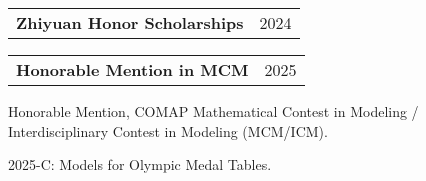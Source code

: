 \documentclass[letterpaper,11pt]{article}
\makeatletter
\newcommand{\cvitem}[1]{
  \item\small{
    {#1\vspace{-2pt}}
  }
}
\newcommand{\twopartheader}[2]{
  \vspace{-2pt}\noindent
  \begin{tabular*}{\textwidth}{l@{\extracolsep{\fill}}r}
    #1 & #2 \\
  \end{tabular*}\vspace{-7pt}
}
\newcommand{\cvheadingstart}{\begin{itemize}[leftmargin=0in, label={}]}
\newcommand{\cvheadingend}{\end{itemize}}
\newcommand{\cvitemstart}{\begin{itemize}[label=\textopenbullet]\justifying}
\newcommand{\cvitemend}{\end{itemize}\vspace{-5pt}}
\makeatother
\begin{document}
\twopartheader{\textbf{Zhiyuan Honor Scholarships}}{2024}
\newline

\twopartheader{\textbf{Honorable Mention in MCM}}{2025}


Honorable Mention, COMAP Mathematical Contest in Modeling / Interdisciplinary Contest in Modeling (MCM/ICM).


2025-C: Models for Olympic Medal Tables.

\end{document}
